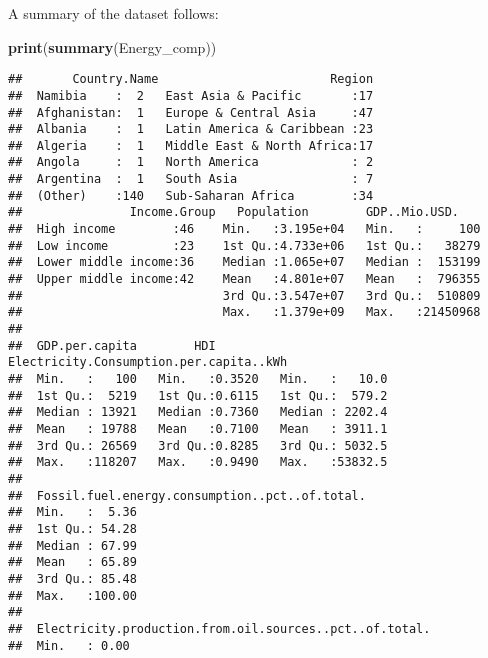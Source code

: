 \documentclass[]{article}
\newenvironment{Shaded}{\begin{snugshade}}{\end{snugshade}}
\newcommand{\KeywordTok}[1]{\textcolor[rgb]{0.13,0.29,0.53}{\textbf{#1}}}
\newcommand{\NormalTok}[1]{#1}
\begin{document}
A summary of the dataset follows:

\begin{Shaded}
\begin{Highlighting}[]
\KeywordTok{print}\NormalTok{(}\KeywordTok{summary}\NormalTok{(Energy_comp))}
\end{Highlighting}
\end{Shaded}

\begin{verbatim}
##       Country.Name                        Region  
##  Namibia    :  2   East Asia & Pacific       :17  
##  Afghanistan:  1   Europe & Central Asia     :47  
##  Albania    :  1   Latin America & Caribbean :23  
##  Algeria    :  1   Middle East & North Africa:17  
##  Angola     :  1   North America             : 2  
##  Argentina  :  1   South Asia                : 7  
##  (Other)    :140   Sub-Saharan Africa        :34  
##               Income.Group   Population        GDP..Mio.USD.     
##  High income        :46    Min.   :3.195e+04   Min.   :     100  
##  Low income         :23    1st Qu.:4.733e+06   1st Qu.:   38279  
##  Lower middle income:36    Median :1.065e+07   Median :  153199  
##  Upper middle income:42    Mean   :4.801e+07   Mean   :  796355  
##                            3rd Qu.:3.547e+07   3rd Qu.:  510809  
##                            Max.   :1.379e+09   Max.   :21450968  
##                                                                  
##  GDP.per.capita        HDI         Electricity.Consumption.per.capita..kWh
##  Min.   :   100   Min.   :0.3520   Min.   :   10.0                        
##  1st Qu.:  5219   1st Qu.:0.6115   1st Qu.:  579.2                        
##  Median : 13921   Median :0.7360   Median : 2202.4                        
##  Mean   : 19788   Mean   :0.7100   Mean   : 3911.1                        
##  3rd Qu.: 26569   3rd Qu.:0.8285   3rd Qu.: 5032.5                        
##  Max.   :118207   Max.   :0.9490   Max.   :53832.5                        
##                                                                           
##  Fossil.fuel.energy.consumption..pct..of.total.
##  Min.   :  5.36                                
##  1st Qu.: 54.28                                
##  Median : 67.99                                
##  Mean   : 65.89                                
##  3rd Qu.: 85.48                                
##  Max.   :100.00                                
##                                                
##  Electricity.production.from.oil.sources..pct..of.total.
##  Min.   : 0.00                                          

\end{verbatim}
\end{document}
